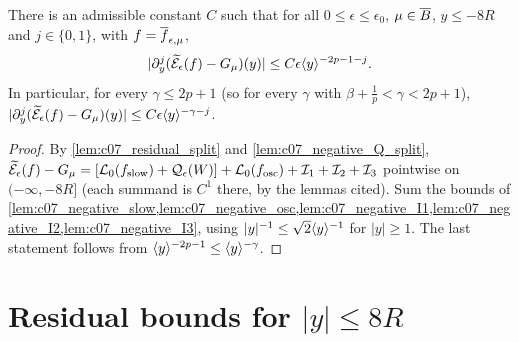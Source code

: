 \begin{proposition}
  \label{prop:approx_residual_negative}
  There is an admissible constant $C$ such that for all $0\le\epsilon\le\epsilon_0$, $\mu\in\overline{B}$,
  $y\le-8R$ and $j\in\{0,1\}$, with $f=\overline{f}_{\epsilon,\mu}$,
  \[
    |\partial_y^j(\widetilde{\mathcal{E}}_\epsilon(f)-G_\mu)(y)|\le C\epsilon\langle y \rangle^{-2p-1-j}.
  \]
  In particular, for every $\gamma\le2p+1$ (so for every $\gamma$ with $\beta+\frac1p<\gamma<2p+1$),
  $|\partial_y^j(\widetilde{\mathcal{E}}_\epsilon(f)-G_\mu)(y)|\le C\epsilon\langle y \rangle^{-\gamma-j}$.
\end{proposition}
\begin{proof}
  By \cref{lem:c07_residual_split} and \cref{lem:c07_negative_Q_split},
  $\widetilde{\mathcal{E}}_\epsilon(f)-G_\mu=[\mathcal{L}_0(f_{\textup{slow}})+\mathcal{Q}_\epsilon(W)]+\mathcal{L}_0(f_{\textup{osc}})+\mathcal{I}_1+\mathcal{I}_2+\mathcal{I}_3$
  pointwise on $(-\infty,-8R]$ (each summand is $C^1$ there, by the lemmas cited). Sum the bounds
  of \cref{lem:c07_negative_slow,lem:c07_negative_osc,lem:c07_negative_I1,lem:c07_negative_I2,lem:c07_negative_I3},
  using $|y|^{-1}\le\sqrt2\langle y \rangle^{-1}$ for $|y|\geq1$. The last statement follows from $\langle y \rangle^{-2p-1}\le\langle y \rangle^{-\gamma}$.
\end{proof}

\section{Residual bounds for \texorpdfstring{$|y|\le8R$}{|y| <= 8R}}

